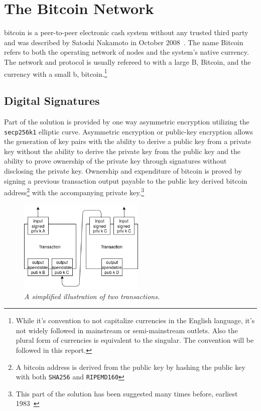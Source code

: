 \chapter{The Bitcoin Network}
	\label{sec:bitcoin}

\gls{bitcoin} is a peer-to-peer electronic cash system without any trusted third party and was described by Satoshi Nakamoto in October 2008~\cite{nakamoto:bitcoin}. The name Bitcoin refers to both the operating network of nodes and the system's native currency. The network and protocol is usually refereed to with a large B, Bitcoin, and the currency with a small b, bitcoin.\footnote{While it's convention to not capitalize currencies in the English language, it's not widely followed in mainstream or semi-mainstream outlets. Also the plural form of currencies is equivalent to the singular. The convention will be followed in this report.}

\section{Digital Signatures}

Part of the solution is provided by one way asymmetric encryption utilizing the \texttt{secp256k1} elliptic curve. Asymmetric encryption or public-key encryption allows the generation of key pairs with the ability to derive a public key from a private key without the ability to derive the private key from the public key and the ability to prove ownership of the private key through signatures without disclosing the private key. Ownership and expenditure of bitcoin is proved by signing a previous transaction output payable to the public key derived bitcoin address\footnote{A bitcoin address is derived from the public key by hashing the public key with both \texttt{SHA256} and \texttt{RIPEMD160}} with the accompanying private key.\footnote{This part of the solution has been suggested many times before, earliest 1983~\cite{chaum:blind:signatures}}

\begin{figure}[!htb]

	\centering
	\includegraphics[width=6cm]{images/transaction.png}
	\caption{\textit{A simplified illustration of two transactions. 
	}}
	\label{fig:two:tx}

\end{figure}

